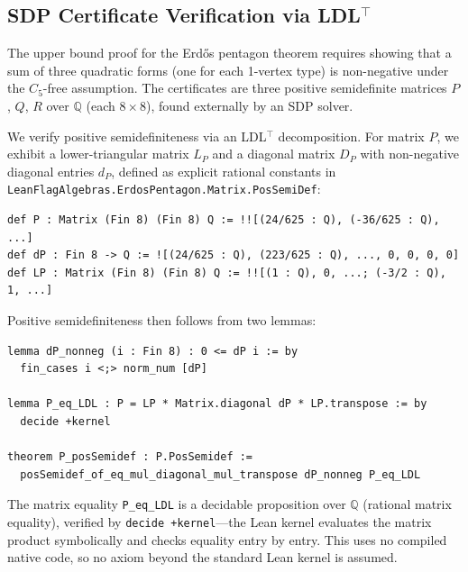 \documentclass{article}
\newcommand{\Q}{\mathbb{Q}}
\newcommand{\lean}[1]{\texttt{#1}}
\begin{document}
\subsection{SDP Certificate Verification via LDL$^\top$}
\label{sec:sdp}

The upper bound proof for the Erd\H{o}s pentagon theorem requires showing
that a sum of three quadratic forms (one for each 1-vertex type) is
non-negative under the $C_5$-free assumption.  The certificates are three
positive semidefinite matrices $P$, $Q$, $R$ over $\Q$ (each $8 \times 8$),
found externally by an SDP solver.

We verify positive semidefiniteness via an LDL$^\top$ decomposition.  For
matrix $P$, we exhibit a lower-triangular matrix $L_P$ and a diagonal matrix
$D_P$ with non-negative diagonal entries $d_P$, defined as explicit rational
constants in \lean{LeanFlagAlgebras.ErdosPentagon.Matrix.PosSemiDef}:
\begin{lstlisting}
def P : Matrix (Fin 8) (Fin 8) Q := !![(24/625 : Q), (-36/625 : Q), ...]
def dP : Fin 8 -> Q := ![(24/625 : Q), (223/625 : Q), ..., 0, 0, 0, 0]
def LP : Matrix (Fin 8) (Fin 8) Q := !![(1 : Q), 0, ...; (-3/2 : Q), 1, ...]
\end{lstlisting}
Positive semidefiniteness then follows from two lemmas:
\begin{lstlisting}
lemma dP_nonneg (i : Fin 8) : 0 <= dP i := by
  fin_cases i <;> norm_num [dP]

lemma P_eq_LDL : P = LP * Matrix.diagonal dP * LP.transpose := by
  decide +kernel

theorem P_posSemidef : P.PosSemidef :=
  posSemidef_of_eq_mul_diagonal_mul_transpose dP_nonneg P_eq_LDL
\end{lstlisting}
The matrix equality \lean{P\_eq\_LDL} is a decidable proposition over $\Q$
(rational matrix equality), verified by \lean{decide +kernel}---the Lean
kernel evaluates the matrix product symbolically and checks equality entry by
entry.  This uses no compiled native code, so no axiom beyond the standard
Lean kernel is assumed.
\end{document}
